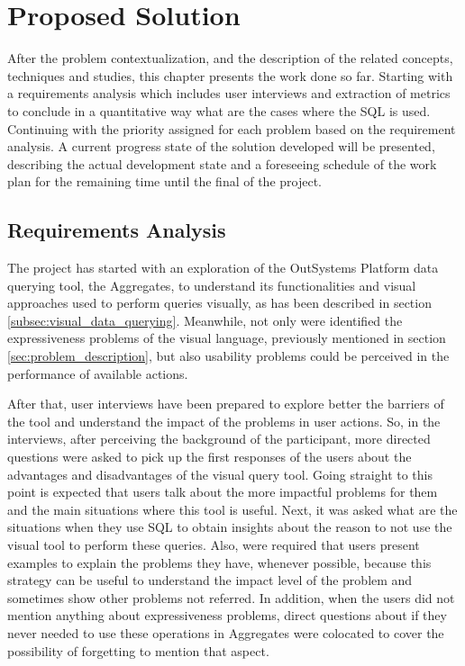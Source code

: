 \chapter{Proposed Solution}
\label{cha:proposed_solution}
After the problem contextualization, and the description of the related concepts, techniques and studies, this chapter presents the work done so far. Starting with a requirements analysis which includes user interviews and extraction of metrics to conclude in a quantitative way what are the cases where the SQL is used. Continuing with the priority assigned for each problem based on the requirement analysis. A current progress state of the solution developed will be presented, describing the actual development state and a foreseeing schedule of the work plan for the remaining time until the final of the project.

\section{Requirements Analysis}
\label{sec:requirements_analysis}
The project has started with an exploration of the OutSystems Platform data querying tool, the Aggregates, to understand its functionalities and visual approaches used to perform queries visually, as has been described in section \ref{subsec:visual_data_querying}. Meanwhile, not only were identified the expressiveness problems of the visual language, previously mentioned in section \ref{sec:problem_description}, but also usability problems could be perceived in the performance of available actions. 

After that, user interviews have been prepared to explore better the barriers of the tool and understand the impact of the problems in user actions. So, in the interviews, after perceiving the background of the participant, more directed questions were asked to pick up the first responses of the users about the advantages and disadvantages of the visual query tool. Going straight to this point is expected that users talk about the more impactful problems for them and the main situations where this tool is useful. Next, it was asked what are the situations when they use SQL to obtain insights about the reason to not use the visual tool to perform these queries. Also, were required that users present examples to explain the problems they have, whenever possible, because this strategy can be useful to understand the impact level of the problem and sometimes show other problems not referred. In addition, when the users did not mention anything about expressiveness problems, direct questions about if they never needed to use these operations in Aggregates were colocated to cover the possibility of forgetting to mention that aspect.

